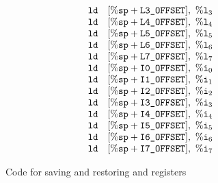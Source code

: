 \begin{figure*}[!t]
{\begin{minipage}[b]{0.5\textwidth}
\[\begin{array}{ll}
                \texttt{ld} & [\%\texttt{sp} + \texttt{L3\_OFFSET}], \ \%\texttt{l}_{3} \\
                \texttt{ld} & [\%\texttt{sp} + \texttt{L4\_OFFSET}], \ \%\texttt{l}_{4} \\
                \texttt{ld} & [\%\texttt{sp} + \texttt{L5\_OFFSET}], \ \%\texttt{l}_{5} \\
                \texttt{ld} & [\%\texttt{sp} + \texttt{L6\_OFFSET}], \ \%\texttt{l}_{6} \\
                \texttt{ld} & [\%\texttt{sp} + \texttt{L7\_OFFSET}], \ \%\texttt{l}_{7} \\
                \texttt{ld} & [\%\texttt{sp} + \texttt{I0\_OFFSET}], \ \%\texttt{i}_{0} \\
                \texttt{ld} & [\%\texttt{sp} + \texttt{I1\_OFFSET}], \ \%\texttt{i}_{1} \\
                \texttt{ld} & [\%\texttt{sp} + \texttt{I2\_OFFSET}], \ \%\texttt{i}_{2} \\
                \texttt{ld} & [\%\texttt{sp} + \texttt{I3\_OFFSET}], \ \%\texttt{i}_{3} \\
                \texttt{ld} & [\%\texttt{sp} + \texttt{I4\_OFFSET}], \ \%\texttt{i}_{4} \\
                \texttt{ld} & [\%\texttt{sp} + \texttt{I5\_OFFSET}], \ \%\texttt{i}_{5} \\
                \texttt{ld} & [\%\texttt{sp} + \texttt{I6\_OFFSET}], \ \%\texttt{i}_{6} \\
                \texttt{ld} & [\%\texttt{sp} + \texttt{I7\_OFFSET}], \ \%\texttt{i}_{7}
            \end{array}
        \]
        \end{minipage}
    }
    \caption{Code for saving and restoring \localRN{} and \inRN{} registers}
\end{figure*}
